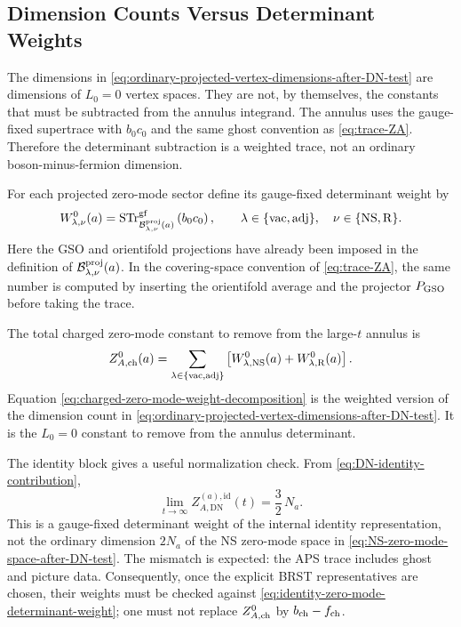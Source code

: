 \documentclass[11pt]{article}
\newcommand{\vac}{\mathrm{vac}}
\newcommand{\NS}{\mathrm{NS}}
\newcommand{\DN}{\mathrm{DN}}
\begin{document}
\subsection{Dimension Counts Versus Determinant Weights}

The dimensions in \eqref{eq:ordinary-projected-vertex-dimensions-after-DN-test} are dimensions
of \(L_0=0\) vertex spaces. They are not, by themselves, the constants that must be subtracted
from the annulus integrand. The annulus uses the gauge-fixed supertrace with \(b_0c_0\) and the
same ghost convention as \eqref{eq:trace-ZA}. Therefore the determinant subtraction is a weighted
trace, not an ordinary boson-minus-fermion dimension.

For each projected zero-mode sector define its gauge-fixed determinant weight by
\begin{equation}
  W_{\lambda,\nu}^{0}(a)
  =
  \operatorname{STr}^{\rm gf}_{\mathcal B_{\lambda,\nu}^{\rm proj}(a)}
  \left(b_0c_0\right),
  \qquad
  \lambda\in\{\vac,\mathrm{adj}\},
  \quad
  \nu\in\{\NS,\mathrm R\}.
  \label{eq:projected-zero-mode-determinant-weight}
\end{equation}
Here the GSO and orientifold projections have already been imposed in the definition of
\(\mathcal B_{\lambda,\nu}^{\rm proj}(a)\). In the covering-space convention of
\eqref{eq:trace-ZA}, the same number is computed by inserting the orientifold average and the
projector \(P_{\rm GSO}\) before taking the trace.

The total charged zero-mode constant to remove from the large-\(t\) annulus is
\begin{equation}
  Z_{A,\rm ch}^{0}(a)
  =
  \sum_{\lambda\in\{\vac,\mathrm{adj}\}}
  \left[
    W_{\lambda,\NS}^{0}(a)+W_{\lambda,\mathrm R}^{0}(a)
  \right].
  \label{eq:charged-zero-mode-weight-decomposition}
\end{equation}
Equation \eqref{eq:charged-zero-mode-weight-decomposition} is the weighted version of the
dimension count in \eqref{eq:ordinary-projected-vertex-dimensions-after-DN-test}. It is the
\(L_0=0\) constant to remove from the annulus determinant.

The identity block gives a useful normalization check. From
\eqref{eq:DN-identity-contribution},
\begin{equation}
  \lim_{t\to\infty}Z_{A,\DN}^{(a),\mathrm{id}}(t)
  =
  \frac32\,N_a.
  \label{eq:identity-zero-mode-determinant-weight}
\end{equation}
This is a gauge-fixed determinant weight of the internal identity representation, not the
ordinary dimension \(2N_a\) of the NS zero-mode space in
\eqref{eq:NS-zero-mode-space-after-DN-test}. The mismatch is expected: the APS trace includes
ghost and picture data. Consequently, once the explicit BRST representatives are chosen, their
weights must be checked against \eqref{eq:identity-zero-mode-determinant-weight}; one must not
replace \(Z_{A,\rm ch}^{0}\) by \(b_{\rm ch}-f_{\rm ch}\).
\end{document}
